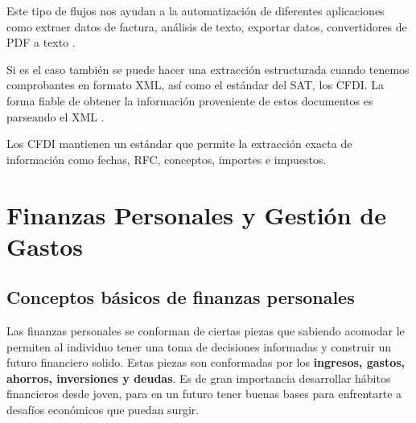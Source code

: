 Este tipo de flujos nos ayudan a la automatización de diferentes aplicaciones como extraer datos de factura, análisis de texto, exportar datos, convertidores de 
PDF a texto \cite{Paseur}\cite{Paseur Extracción}.

Si es el caso también se puede hacer una extracción estructurada cuando tenemos comprobantes en formato XML, así como el estándar del SAT, los CFDI. La forma fiable de 
obtener la información proveniente de estos documentos es parseando el XML \cite{Timbox}.

Los CFDI mantienen un estándar que permite la extracción exacta de información como fechas, RFC, conceptos, importes e impuestos. 


\section{Finanzas Personales y Gestión de Gastos}
\subsection{Conceptos básicos de finanzas personales}
Las finanzas personales se conforman de ciertas piezas que sabiendo acomodar le permiten al individuo tener una toma de decisiones informadas y construir un futuro 
financiero solido. Estas piezas son conformadas por los \textbf{ingresos, gastos, ahorros, inversiones y deudas}. Es de gran importancia desarrollar hábitos financieros 
desde joven, para en un futuro tener buenas bases para enfrentarte a desafíos económicos que puedan surgir.

